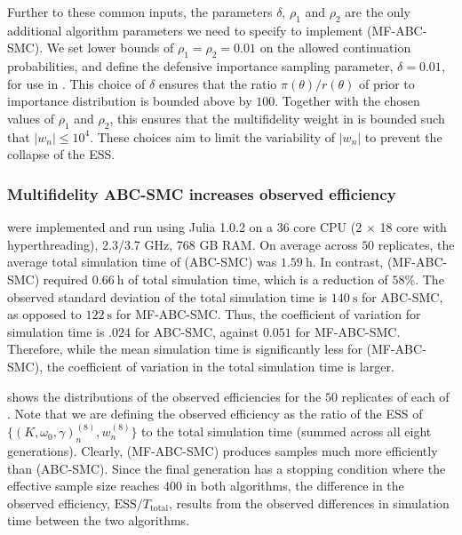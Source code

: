 \documentclass[review,demo]{siamonline190516}
\begin{document}
Further to these common inputs, the parameters $\delta$, $\rho_1$ and $\rho_2$ are the only additional algorithm parameters we need to specify to implement  (MF-ABC-SMC).
We set lower bounds of $\rho_1 = \rho_2 = 0.01$ on the allowed continuation probabilities, and define the defensive importance sampling parameter, $\delta = 0.01$, for use in .
This choice of $\delta$ ensures that the ratio $\pi(\theta)/r(\theta)$ of prior to importance distribution is bounded above by $100$.
Together with the chosen values of $\rho_1$ and $\rho_2$, this ensures that the multifidelity weight in  is bounded such that $|w_n| \leq 10^4$.
These choices aim to limit the variability of $|w_n|$ to prevent the collapse of the ESS.

\subsubsection{Multifidelity ABC-SMC increases observed efficiency}
\label{s:Results:Efficiency}

 were implemented and run using Julia 1.0.2 on a 36 core CPU (2 $\times$ 18 core with hyperthreading), 2.3/3.7 GHz, 768 GB RAM.
On average across $50$ replicates, the average total simulation time of  (ABC-SMC) was $1.59~\mathrm{h}$. 
In contrast,  (MF-ABC-SMC) required $0.66~\mathrm{h}$ of total simulation time, which is a reduction of $58\%$.
The observed standard deviation of the total simulation time is $140~\mathrm{s}$ for ABC-SMC, as opposed to $122~\mathrm{s}$ for MF-ABC-SMC.
Thus, the coefficient of variation for simulation time is $.024$ for ABC-SMC, against $0.051$ for MF-ABC-SMC.
Therefore, while the mean simulation time is significantly less for  (MF-ABC-SMC), the coefficient of variation in the total simulation time is larger.

 shows the distributions of the observed efficiencies for the $50$ replicates of each of .
Note that we are defining the observed efficiency as the ratio of the ESS of $\{(K, \omega_0, \gamma)_n^{(8)},  w_n^{(8)} \}$ to the total simulation time (summed across all eight generations).
Clearly,  (MF-ABC-SMC) produces samples much more efficiently than  (ABC-SMC).
Since the final generation has a stopping condition where the effective sample size reaches $400$ in both algorithms, the difference in the observed efficiency, $\mathrm{ESS}/T_{\mathrm{total}}$, results from the observed differences in simulation time between the two algorithms.
\end{document}
